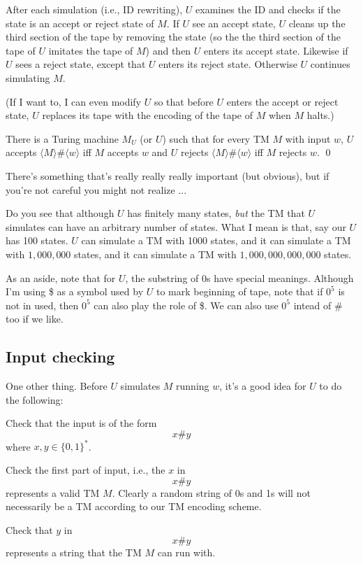 After each simulation (i.e., ID rewriting),
$U$ examines the ID and checks if the state is
an accept or reject state of $M$.
If $U$ see an accept state, $U$ cleans up
the third section of the tape by removing the state
(so the the third section of the tape of $U$ imitates
the tape of $M$) and then $U$ enters its accept state.
Likewise if $U$ sees a reject state, except that $U$
enters its reject state.
Otherwise $U$ continues simulating $M$.

(If I want to, I can even modify $U$ so that before $U$
enters the accept or reject state,
$U$ replaces its tape with the
encoding of the
tape of $M$ when $M$ halts.)

\begin{thm}
There is a Turing machine $M_U$ (or $U$)
such that for every TM $M$ with input $w$,
$U$ accepts $\langle M \rangle \# \langle w \rangle$
iff $M$ accepts $w$
and 
$U$ rejects $\langle M \rangle \# \langle w \rangle$
iff $M$ rejects $w$.
\qed
\end{thm}

There's something that's really really really important (but obvious),
but if you're
not careful you might not realize ...

Do you see that although $U$ has finitely many states, \textit{but}
the TM that $U$ simulates can have an arbitrary number of states.
What I mean is that, say our $U$ has 100 states.
$U$ can simulate a TM with 1000 states,
and it can simulate a TM with $1,000,000$ states,
and it can simulate a TM with $1,000,000,000,000$ states.

As an aside, note that for $U$, the substring of $0$s have
special meanings.
Although I'm using \$ as a symbol used by $U$ to mark beginning of
tape, note that if $0^5$ is not in used, then $0^5$ can also play the role
of \$.
We can also use $0^5$ intead of $\#$ too if we like.

\subsection{Input checking}

One other thing.
Before $U$ simulates
$M$ running $w$,
it's a good idea for $U$ to do the following:
\begin{tightlist}
  \item Check that the input is of the form
  \[
  x \# y
  \]
  where $x, y \in \{0,1\}^*$.
  \item Check the first part of input, i.e.,
the $x$ in
\[
x \# y
\]
represents a valid TM $M$. Clearly
a random string of 0s and 1s will not necessarily be a TM according to
our TM encoding scheme.
\item Check that $y$ in
\[
x \# y
\]
represents a string
that the TM $M$ can run with.
\end{tightlist}


